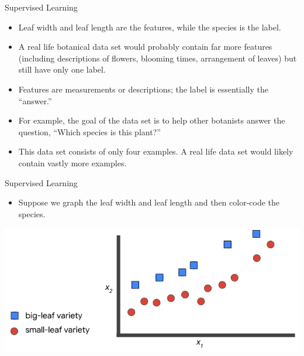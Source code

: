 \documentclass{beamer}
\begin{document}
\begin{frame}{Supervised Learning}

\begin{itemize}

\item Leaf width and leaf length are the features, while the species is the label. 

\item A real life botanical data set would probably contain far more features (including descriptions of flowers, blooming times, arrangement of leaves) but still have only one label. 

\item Features are measurements or descriptions; the label is essentially the ``answer.'' 

\item For example, the goal of the data set is to help other botanists answer the question, ``Which species is this plant?''

\item This data set consists of only four examples. A real life data set would likely contain vastly more examples.

\end{itemize}

\end{frame}


\begin{frame}{Supervised Learning}

\begin{itemize}
\item Suppose we graph the leaf width and leaf length and then color-code the species.
\end{itemize}

\bigskip

\includegraphics[width=\textwidth]{images/Graph1.png}

\end{frame}
\end{document}
